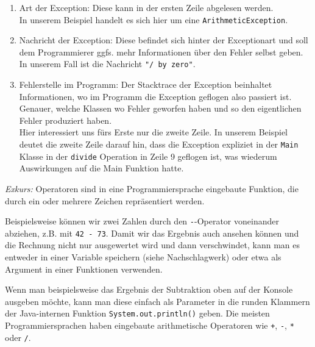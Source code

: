 \begin{Infobox}[Exceptions]
    \begin{enumerate}[label=\roman*)]
        \item Art der Exception: Diese kann in der ersten Zeile abgelesen werden.\\
            In unserem Beispiel handelt es sich hier um eine \lstinline{ArithmeticException}.
        \item Nachricht der Exception: Diese befindet sich hinter der Exceptionart und soll dem Programmierer ggfs. mehr Informationen über den Fehler selbst geben.\\
            In unserem Fall ist die Nachricht \lstinline{"/ by zero"}.
        \item Fehlerstelle im Programm: Der Stacktrace der Exception beinhaltet Informationen, wo im Programm die Exception geflogen also passiert ist. Genauer, welche Klassen wo Fehler geworfen haben und so den eigentlichen Fehler produziert haben.\\
            Hier interessiert uns fürs Erste nur die zweite Zeile. In unserem Beispiel deutet die zweite Zeile darauf hin, dass die Exception expliziet in der \lstinline{Main} Klasse in der \lstinline{divide}
        Operation in Zeile 9 geflogen ist, was wiederum Auswirkungen auf die Main Funktion hatte.
    \end{enumerate}

    \textit{Exkurs:} Operatoren sind in eine Programmiersprache eingebaute Funktion, die durch ein oder mehrere Zeichen repräsentiert werden.\newline

    Beispielsweise können wir zwei Zahlen durch den \texttt{-}-Operator voneinander abziehen, z.B. mit \texttt{42 - 73}.
    Damit wir das Ergebnis auch ansehen können und die Rechnung nicht nur ausgewertet wird und dann verschwindet, kann man es entweder in einer Variable speichern (siehe Nachschlagwerk) oder etwa als Argument in einer Funktionen verwenden.\newline

    Wenn man beispielsweise das Ergebnis der Subtraktion oben auf der Konsole ausgeben möchte, kann man diese einfach als Parameter in die runden Klammern der Java-internen Funktion \lstinline{System.out.println()} geben.
    Die meisten Programmiersprachen haben eingebaute arithmetische Operatoren wie \texttt{+}, \texttt{-}, \texttt{*} oder \texttt{/}.

\end{Infobox}


